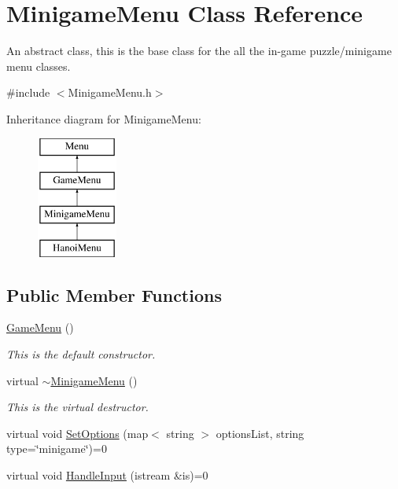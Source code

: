 \hypertarget{classMinigameMenu}{\section{Minigame\-Menu Class Reference}
\label{classMinigameMenu}
}


An abstract class, this is the base class for the all the in-\/game puzzle/minigame menu classes.  




{\ttfamily \#include $<$Minigame\-Menu.\-h$>$}

Inheritance diagram for Minigame\-Menu\-:\begin{figure}[H]
\begin{center}
\leavevmode
\includegraphics[height=4.000000cm]{classMinigameMenu}
\end{center}
\end{figure}
\subsection*{Public Member Functions}
\begin{DoxyCompactItemize}
\item 
\hypertarget{classMinigameMenu_ae43222d43cab574372707a21bd22a2b5}{\hyperlink{classMinigameMenu_ae43222d43cab574372707a21bd22a2b5}{Game\-Menu} ()}\label{classMinigameMenu_ae43222d43cab574372707a21bd22a2b5}

\begin{DoxyCompactList}\small\item\em This is the default constructor. \end{DoxyCompactList}\item 
\hypertarget{classMinigameMenu_a6b8621ca44319d6b2759766bdca9cbf9}{virtual \hyperlink{classMinigameMenu_a6b8621ca44319d6b2759766bdca9cbf9}{$\sim$\-Minigame\-Menu} ()}\label{classMinigameMenu_a6b8621ca44319d6b2759766bdca9cbf9}

\begin{DoxyCompactList}\small\item\em This is the virtual destructor. \end{DoxyCompactList}\item 
virtual void \hyperlink{classMinigameMenu_abf3dcda8c256be03ebe3661b8dde2ea2}{Set\-Options} (map$<$ string $>$ options\-List, string type=\char`\"{}minigame\char`\"{})=0
\item 
virtual void \hyperlink{classMinigameMenu_a3f854c4eefb0f3110cd085b3cfe56460}{Handle\-Input} (istream \&is)=0
\end{DoxyCompactItemize}
